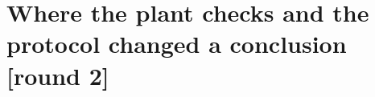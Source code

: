 \section{Where the plant checks and the protocol changed a conclusion [round 2]}\label{sec:where_the_plant_checks_and_the_protocol_}

